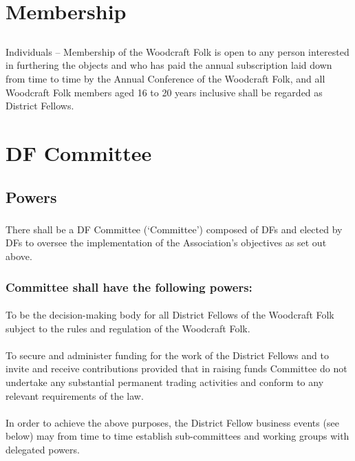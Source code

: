 \documentclass[a4paper, 12pt]{article}
\begin{document}
\section{Membership}
\subsection{}
\label{sec:membership}
Individuals -- Membership of the Woodcraft Folk is open to any person interested in furthering the objects and who has paid the annual subscription laid down from time to time by the Annual Conference of the Woodcraft Folk, and all Woodcraft Folk members aged 16 to 20 years inclusive shall be regarded as District Fellows.

\section{DF Committee}
\subsection{Powers}
\subsubsection{}
There shall be a DF Committee (`Committee') composed of DFs and elected by DFs to oversee the implementation of the Association’s objectives as set out above.

\subsubsection{Committee shall have the following powers:}
\paragraph{}
To be the decision-making body for all District Fellows of the Woodcraft Folk subject to the rules and regulation of the Woodcraft Folk.
\paragraph{}
To secure and administer funding for the work of the District Fellows and to invite and receive contributions provided that in raising funds Committee do not undertake any substantial permanent trading activities and conform to any relevant requirements of the law.
\paragraph{}
In order to achieve the above purposes, the District Fellow business events (see below) may from time to time establish sub-committees and working groups with delegated powers.
\end{document}
